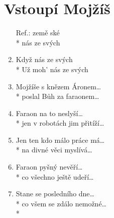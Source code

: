 \section{Vstoupí Mojžíš}
\begin{enumerate}
\item[Ref.:]    země ské \\*
   nás ze svých  
\item Když    nás ze svých   \\*
Už moh'     nás ze svých  
\item Mojžíše s knězem Áronem… \\*
poslal Bůh za faraonem… 
\item Faraon na to neslyší… \\*
jen v robotách jim přitíží… 
\item Jen ten kdo málo práce má… \\*
na divné věci myslívá… 
\item Faraon pyšný nevěří… \\*
co všechno ještě udeří… 
\item Stane se posledního dne… \\*
co všem se zdálo nemožné… \\*
\end{enumerate}
